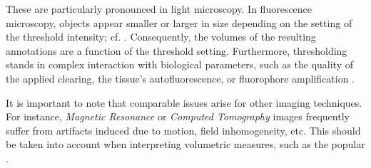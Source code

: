 

These are particularly pronounced in light microscopy.
In fluorescence microscopy, objects appear smaller or larger in size depending on the setting of the threshold intensity; cf. .
Consequently, the volumes of the resulting annotations are a function of the threshold setting.
Furthermore, thresholding stands in complex interaction with biological parameters, such as the quality of the applied clearing, the tissue's autofluorescence, or fluorophore amplification \citep{cai2019panoptic}.


It is important to note that comparable issues arise for other imaging techniques.
For instance, \emph{Magnetic Resonance} or \emph{Computed Tomography} images frequently suffer from artifacts induced due to motion, field inhomogeneity, etc.
This should be taken into account when interpreting volumetric measures, such as the popular .

